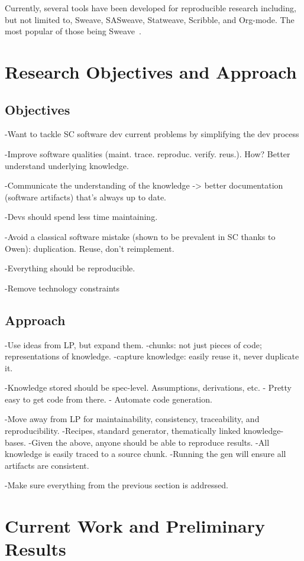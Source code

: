 \documentclass{article}
\begin{document}
Currently, several tools have been developed for reproducible research including, but not limited to, Sweave, SASweave, Statweave, Scribble, and Org-mode. The most popular of those being Sweave~\cite{SchulteEtAl2012}.

\section{Research Objectives and Approach}
\subsection{Objectives}
-Want to tackle SC software dev current problems by simplifying the dev process

-Improve software qualities (maint. trace. reproduc. verify. reus.). How? Better understand underlying knowledge.

-Communicate the understanding of the knowledge -> better documentation (software artifacts) that's always up to date.

-Devs should spend less time maintaining.

-Avoid a classical software mistake (shown to be prevalent in SC thanks to Owen): duplication. Reuse, don't reimplement.

-Everything should be reproducible.

-Remove technology constraints

\subsection{Approach}

-Use ideas from LP, but expand them.
	-chunks: not just pieces of code; representations of knowledge.
	-capture knowledge: easily reuse it, never duplicate it.

-Knowledge stored should be spec-level. Assumptions, derivations, etc.
	- Pretty easy to get code from there.
	- Automate code generation.
	
-Move away from LP for maintainability, consistency, traceability, and reproducibility.
	-Recipes, standard generator, thematically linked knowledge-bases.
	-Given the above, anyone should be able to reproduce results.
	-All knowledge is easily traced to a source chunk.
	-Running the gen will ensure all artifacts are consistent.
	
-Make sure everything from the previous section is addressed.

\section{Current Work and Preliminary Results}
\end{document}
